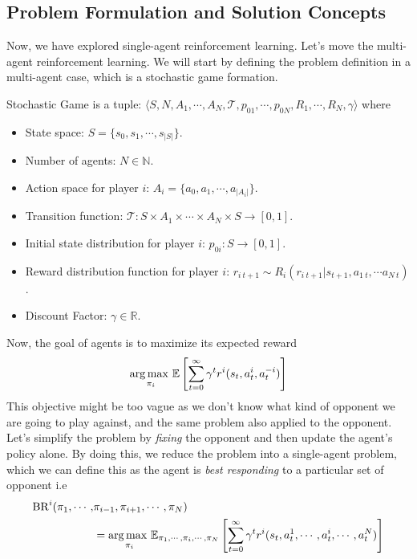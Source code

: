 \label{sec:chap2-multi-agent-rl}

\subsection{Problem Formulation and Solution Concepts}
\label{sec:chap2-formulation-concepts}
Now, we have explored single-agent reinforcement learning. Let's move the multi-agent reinforcement learning. We will start by defining the problem definition in a multi-agent case, which is a stochastic game \cite{shapley1953stochastic} formation. 
\begin{definition}
Stochastic Game is a tuple: $\langle S, N, A_1, \cdots, A_N, \mathcal{T}, p_{01}, \cdots, p_{0N}, R_1, \cdots, R_N, \gamma \rangle$ where 
\begin{itemize}
    \item State space: $S = \{s_0, s_1, \cdots , s_{|S|}\}$. 
    \item Number of agents: $N \in \mathbb{N}$. 
    \item Action space for player $i$: $A_i = \{a_0, a_1, \cdots, a_{|A_i|}\}$. 
    \item Transition function: $\mathcal{T} : S \times A_1 \times \cdots \times A_N \times S \rightarrow [0, 1]$.  
    \item Initial state distribution for player $i$: $p_{0i}: S \rightarrow [0, 1]$. 
    \item Reward distribution function for player $i$: $r_{i \ t+1} \sim R_i(r_{i \ t+1} | s_{t+1}, a_{1 \ t}, \cdots a_{N \ t})$.
    \item Discount Factor: $\gamma \in \mathbb{R}$. 
\end{itemize}
\end{definition}
\noindent
Now, the goal of agents is to maximize its expected reward
\begin{equation}
    \underset{\pi_i}{\arg\max \ } \mathbb{E}\left[ \sum^\infty_{t=0} \gamma ^t r^i(s_t, a^i_t, a^{-i}_t)  \right] 
\end{equation}
This objective might be too vague as we don't know what kind of opponent we are going to play against, and the same problem also applied to the opponent. Let's simplify the problem by \textit{fixing} the opponent and then update the agent's policy alone. By doing this, we reduce the problem into a single-agent problem, which we can define this as the agent is \textit{best responding} to a particular set of opponent i.e 
\begin{equation}
\begin{aligned}
    \operatorname{BR}^i(\pi_1, \cdots, &\pi_{i-1}, \pi_{i+1}, \cdots, \pi_N) \\
    &= \underset{\pi_i}{\arg\max \ } \mathbb{E}_{\pi_1, \cdots , \pi_i, \cdots, \pi_N}\left[ \sum^\infty_{t=0} \gamma ^t r^i(s_t, a^1_t, \cdots, a^i_t, \cdots, a^{N}_t)  \right]
\end{aligned}
\end{equation}
